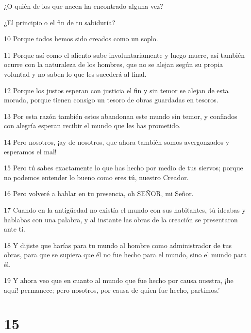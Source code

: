 \par ¿O quién de los que nacen ha encontrado alguna vez?

\par ¿El principio o el fin de tu sabiduría?


\par 10 Porque todos hemos sido creados como un soplo.

\par 11 Porque así como el aliento sube involuntariamente y luego muere, así también ocurre con la naturaleza de los hombres, que no se alejan según su propia voluntad y no saben lo que les sucederá al final.

\par 12 Porque los justos esperan con justicia el fin y sin temor se alejan de esta morada, porque tienen consigo un tesoro de obras guardadas en tesoros.

\par 13 Por esta razón también estos abandonan este mundo sin temor, y confiados con alegría esperan recibir el mundo que les has prometido.

\par 14 Pero nosotros, ¡ay de nosotros, que ahora también somos avergonzados y esperamos el mal!

\par 15 Pero tú sabes exactamente lo que has hecho por medio de tus siervos; porque no podemos entender lo bueno como eres tú, nuestro Creador.

\par 16 Pero volveré a hablar en tu presencia, oh SEÑOR, mi Señor.

\par 17 Cuando en la antigüedad no existía el mundo con sus habitantes, tú ideabas y hablabas con una palabra, y al instante las obras de la creación se presentaron ante ti.

\par 18 Y dijiste que harías para tu mundo al hombre como administrador de tus obras, para que se supiera que él no fue hecho para el mundo, sino el mundo para él.

\par 19 Y ahora veo que en cuanto al mundo que fue hecho por causa nuestra, ¡he aquí! permanece; pero nosotros, por causa de quien fue hecho, partimos.'

\chapter{15}

